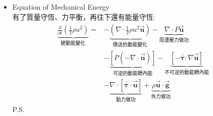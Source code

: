 \documentclass[../main.tex]{subfiles}
\begin{document}
\begin{itemize}
\begin{itemize}
      因此此步驟其實假設了恆溫恆密度流體
      \begin{equation}
        \rho \frac{D\vec {\bm u}}{Dt} = -\nabla P + \nabla \cdot \overline{\overline{\bm \tau}} + \rho \vec {\bm g}
      \end{equation}
      若為牛頓流體，且黏度、密度不變，則可化簡為Navier-Stokes Equation
      \begin{equation}
        \rho\left(
          \frac{\partial \vec {\bm u}}{\partial t} + \vec {\bm u} \cdot \nabla \vec {\bm u}
        \right) = \rho \frac{D\vec {\bm u}}{Dt} = -\nabla P + \mu \nabla^2 \vec {\bm u} + \rho \vec {\bm g}
      \end{equation}
      當流體流速很慢，加速度項可以忽略時，則會變成Stokes Flow Equation，或是Creeping Flow Equation
      \begin{equation}
        0 = -\nabla P + \mu \nabla^2 \vec {\bm u} + \rho \vec {\bm g}
      \end{equation}
      而當$\mu =0$時，會再進一步變成Euler Equation(或者說雷諾數無限大)
      \begin{equation}
        \rho\left(
          \frac{\partial \vec {\bm u}}{\partial t} + \vec {\bm u} \cdot \nabla \vec {\bm u}
        \right)= \rho \frac{D\vec {\bm u}}{Dt}  = -\nabla P + \rho \vec {\bm g}
      \end{equation}
    \item  Equation of Mechanical Energy\\
      有了質量守恆、力平衡，再往下還有能量守恆:
      \begin{align}
        \underbrace{\frac{\partial}{\partial t}\left(\frac{1}{2}\rho u^2\right)}_{\text{總動能變化}}
        =&-\underbrace{\left(\nabla \cdot \frac{1}{2}\rho u^2 \vec{\bm u}\right)}_{\text{傳送的動能變化}}
        -\underbrace{\nabla \cdot P \vec{\bm u}}_{\text{周遭壓力做功}} \nonumber \\
        &-\underbrace{\left[P\left(-\nabla \cdot \vec{\bm u}\right)\right]}_{\text{可逆的動能轉內能}}
        -\underbrace{\left[-\overline{\overline{\bm \tau}}  : \nabla \vec{\bm u}\right]}_{\text{不可逆的動能轉內能}} \nonumber \\
        &-\underbrace{\nabla\cdot [\overline{\overline{\bm \tau}} \cdot \vec{\bm u}]}_{\text{黏力做功}} 
        + \underbrace{\rho \vec{\bm u}\cdot \vec{\bm g} }_{\text{外力做功}} \label{eq:mechanical_energy_equation}
      \end{align}
      P.S.\\

\end{itemize}
\end{itemize}
\end{document}
